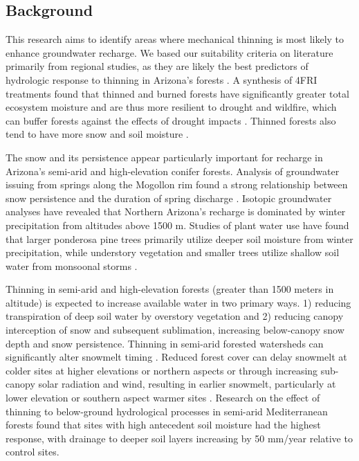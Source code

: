 \documentclass[
  number,
  preprint,
  3p,
  onecolumn]{elsarticle}
\begin{document}
\subsection{Background}\label{background}

This research aims to identify areas where mechanical thinning is most
likely to enhance groundwater recharge. We based our suitability
criteria on literature primarily from regional studies, as they are
likely the best predictors of hydrologic response to thinning in
Arizona's forests \citep{wyatt_estimating_2013}. A synthesis of 4FRI
treatments found that thinned and burned forests have significantly
greater total ecosystem moisture and are thus more resilient to drought
and wildfire, which can buffer forests against the effects of drought
impacts \citep{sankey_thinning_2022, sankey_regionalscale_2021}. Thinned
forests also tend to have more snow and soil moisture
\citep{odonnell_vegetation_2021}.

The snow and its persistence appear particularly important for recharge
in Arizona's semi-arid and high-elevation conifer forests. Analysis of
groundwater issuing from springs along the Mogollon rim found a strong
relationship between snow persistence and the duration of spring
discharge \citep{donovan2022}. Isotopic groundwater analyses have
revealed that Northern Arizona's recharge is dominated by winter
precipitation from altitudes above 1500
m\citep{eastoe2007, eastoe2023, earman2006, blasch2006}. Studies of
plant water use have found that larger ponderosa pine trees primarily
utilize deeper soil moisture from winter precipitation, while understory
vegetation and smaller trees utilize shallow soil water from monsoonal
storms \citep{kerhoulas2013, kerhoulas2023}.

Thinning in semi-arid and high-elevation forests (greater than 1500
meters in altitude) is expected to increase available water in two
primary ways. 1) reducing transpiration of deep soil water by overstory
vegetation and 2) reducing canopy interception of snow and subsequent
sublimation, increasing below-canopy snow depth and snow persistence.
Thinning in semi-arid forested watersheds can significantly alter
snowmelt timing \citep{dwivedi2024}. Reduced forest cover can delay
snowmelt at colder sites at higher elevations or northern aspects or
through increasing sub-canopy solar radiation and wind, resulting in
earlier snowmelt, particularly at lower elevation or southern aspect
warmer sites \citep{biederman_recent_2015, dwivedi2024}. Research on the
effect of thinning to below-ground hydrological processes in semi-arid
Mediterranean forests found that sites with high antecedent soil
moisture had the highest response, with drainage to deeper soil layers
increasing by 50 mm/year relative to control
sites\citep{del_campo_effectiveness_2019}.
\end{document}
